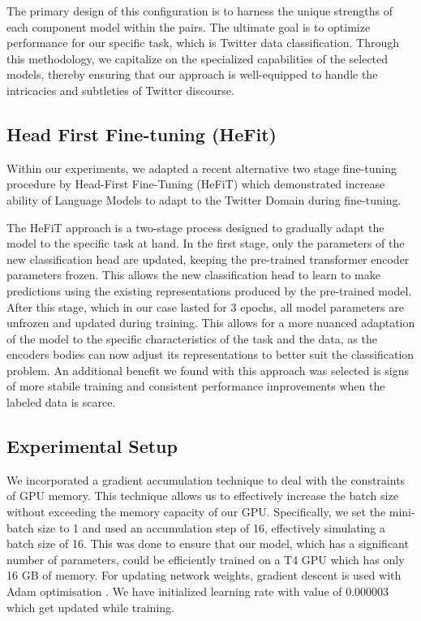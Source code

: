 \documentclass[]{ceurart}
\begin{document}
The primary design of this configuration is to harness the unique strengths of each component model within the pairs. The ultimate goal is to optimize performance for our specific task, which is Twitter data classification. Through this methodology, we capitalize on the specialized capabilities of the selected models, thereby ensuring that our approach is well-equipped to handle the intricacies and subtleties of Twitter discourse.

\subsection{Head First Fine-tuning (HeFit)}

Within our experiments, we adapted a recent alternative two stage fine-tuning procedure  by Head-First Fine-Tuning (HeFiT) \cite{michail2023uzh_clyp} which demonstrated increase ability of Language Models to adapt to the Twitter Domain during fine-tuning.

The HeFiT approach is a two-stage process designed to gradually adapt the model to the specific task at hand. In the first stage, only the parameters of the new classification head are updated, keeping the pre-trained transformer encoder parameters frozen. This allows the new classification head to learn to make predictions using the existing representations produced by the pre-trained model. After this stage, which in our case lasted for 3 epochs, all model parameters are unfrozen and updated during training. This allows for a more nuanced adaptation of the model to the specific characteristics of the task and the data, as the encoders bodies can now adjust its representations to better suit the classification problem. An additional benefit we found with this approach was selected is signs of more stabile training and consistent performance improvements when the labeled data is scarce.

\subsection{Experimental Setup}
We incorporated a gradient accumulation technique to deal with the constraints of GPU memory. This technique allows us to effectively increase the batch size without exceeding the memory capacity of our GPU. Specifically, we set the mini-batch size to 1 and used an accumulation step of 16, effectively simulating a batch size of 16. This was done to ensure that our model, which has a significant number of parameters, could be efficiently trained on a T4 GPU which has only 16 GB of memory. For updating network weights, gradient descent is used with Adam optimisation \cite{kingma2017adam}. We have initialized learning rate with value of 0.000003 which get updated while training.
\end{document}
